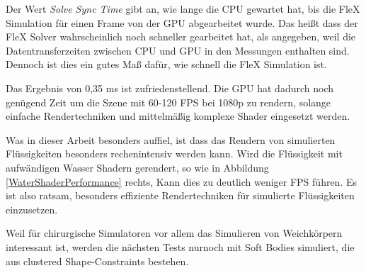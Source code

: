 Der Wert \textit{Solve Sync Time} gibt an, wie lange die CPU gewartet hat, bis die FleX Simulation für einen Frame von der GPU abgearbeitet wurde. Das heißt dass der FleX Solver wahrscheinlich noch schneller gearbeitet hat, als angegeben, weil die Datentransferzeiten zwischen CPU und GPU in den Messungen enthalten sind. Dennoch ist dies ein gutes Maß dafür, wie schnell die FleX Simulation ist.

Das Ergebnis von 0,35 ms ist zufriedenstellend. Die GPU hat dadurch noch genügend Zeit um die Szene mit 60-120 \ac{FPS} bei 1080p zu rendern, solange einfache Rendertechniken und mittelmäßig komplexe Shader eingesetzt werden. 

Was in dieser Arbeit besonders auffiel, ist dass das Rendern von simulierten Flüssigkeiten besonders rechenintensiv werden kann. Wird die Flüssigkeit mit aufwändigen Wasser Shadern gerendert, so wie in Abbildung \ref{WaterShaderPerformance} rechts, Kann dies zu deutlich weniger \ac{FPS} führen. Es ist also ratsam, besonders effiziente Rendertechniken für simulierte Flüssigkeiten einzusetzen.

Weil für chirurgische Simulatoren vor allem das Simulieren von Weichkörpern interessant ist, werden die nächsten Tests nurnoch mit Soft Bodies simuliert, die aus clustered Shape-Constraints bestehen.

\clearpage
